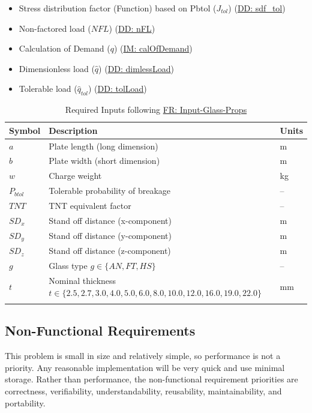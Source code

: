 \documentclass[12pt]{article}
\begin{document}
\begin{itemize}
\begin{itemize}
                                                            \item{Stress distribution factor (Function) based on Pbtol (${J_{tol}}$) (\hyperref[DD:sdf.tol]{DD: sdf\_tol})}
                                                            \item{Non-factored load ($NFL$) (\hyperref[DD:nFL]{DD: nFL})}
                                                            \item{Calculation of Demand ($q$) (\hyperref[IM:calOfDemand]{IM: calOfDemand})}
                                                            \item{Dimensionless load ($\hat{q}$) (\hyperref[DD:dimlessLoad]{DD: dimlessLoad})}
                                                            \item{Tolerable load (${\hat{q}_{tol}}$) (\hyperref[DD:tolLoad]{DD: tolLoad})}
                                                            \end{itemize}
\end{itemize}
\begin{longtabu}{l X[l] l}
\toprule
Symbol & Description & Units
\\
\midrule
$a$ & Plate length (long dimension) & m
\\
$b$ & Plate width (short dimension) & m
\\
$w$ & Charge weight & kg
\\
${P_{btol}}$ & Tolerable probability of breakage & --
\\
$TNT$ & TNT equivalent factor & --
\\
${SD_{x}}$ & Stand off distance (x-component) & m
\\
${SD_{y}}$ & Stand off distance (y-component) & m
\\
${SD_{z}}$ & Stand off distance (z-component) & m
\\
$g$ & Glass type $g\in{}\{AN,FT,HS\}$ & --
\\
$t$ & Nominal thickness $t\in{}\{2.5,2.7,3.0,4.0,5.0,6.0,8.0,10.0,12.0,16.0,19.0,22.0\}$ & mm
\\
\bottomrule
\caption{Required Inputs following \hyperref[inputGlassProps]{FR: Input-Glass-Props}}
\label{Table:InputGlassPropsReqInputs}
\end{longtabu}
\subsection{Non-Functional Requirements}
\label{Sec:NFRs}
This problem is small in size and relatively simple, so performance is not a priority. Any reasonable implementation will be very quick and use minimal storage. Rather than performance, the non-functional requirement priorities are correctness, verifiability, understandability, reusability, maintainability, and portability.
\end{document}
